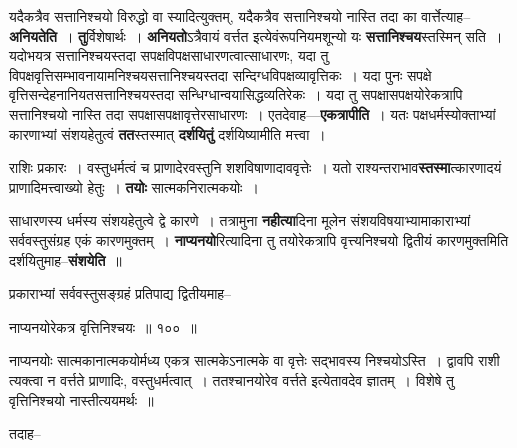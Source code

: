 \documentclass[article,12pt,a4paper]{memoir}
\begin{document}
	  \endgroup
	

	  \pstart यदैकत्रैव सत्तानिश्चयो विरुद्धो वा स्यादित्युक्तम्, यदैकत्रैव सत्तानिश्चयो नास्ति तदा का वार्त्तेत्याह--\textbf{अनियतेति} । \textbf{तु}र्विशेषार्थः । \textbf{अनियतो}ऽत्रैवायं वर्त्तत इत्येवंरूपनियमशून्यो यः \textbf{सत्तानिश्चय}स्तस्मिन् सति । यदोभयत्र सत्तानिश्चयस्तदा सपक्षविपक्षसाधारणत्वात्साधारणः, यदा तु विपक्षवृत्तिसम्भावनायामनिश्चयसत्तानिश्चयस्तदा सन्दिग्धविपक्षव्यावृत्तिकः । यदा पुनः सपक्षे वृत्तिसन्देहनानियतसत्तानिश्चयस्तदा सन्धिग्धान्वयासिद्धव्यतिरेकः । यदा तु सपक्षासपक्षयोरेकत्रापि सत्तानिश्चयो नास्ति तदा सपक्षासपक्षावृत्तेरसाधारणः । एतदेवाह—\textbf{एकत्रापीति} । यतः पक्षधर्मस्योक्ताभ्यां कारणाभ्यां संशयहेतुत्वं \textbf{तत}स्तस्मात् \textbf{दर्शयितुं} दर्शयिष्यामीति मत्त्वा ।
	\pend
      

	  \pstart राशिः प्रकारः । वस्तुधर्मत्वं च प्राणादेरवस्तुनि शशविषाणादाववृत्तेः । यतो राश्यन्तराभाव\textbf{स्तस्मा}त्कारणादयं प्राणादिमत्त्वाख्यो हेतुः । \textbf{तयोः} सात्मकनिरात्मकयोः ।
	\pend
      

	  \pstart साधारणस्य धर्मस्य संशयहेतुत्वे द्वे कारणे । तत्रामुना \textbf{नहीत्या}दिना मूलेन संशयविषयाभ्यामाकाराभ्यां सर्ववस्तुसंग्रह एकं कारणमुक्तम् । \textbf{नाप्यनयो}रित्यादिना तु तयोरेकत्रापि वृत्त्यनिश्चयो द्वितीयं कारणमुक्तमिति दर्शयितुमाह--\textbf{संशयेति} ॥
	\pend
	  \bigskip
	  \begingroup
	

	  \pstart प्रकाराभ्यां सर्ववस्तुसङ्ग्रहं प्रतिपाद्य द्वितीयमाह--
	\pend
        
	  \bigskip
	  \begingroup
	

	  \pstart नाप्यनयोरेकत्र वृत्तिनिश्चयः ॥ १०० ॥
	\pend
      
	  \endgroup
	 

	  \pstart नाप्यनयोः सात्मकानात्मकयोर्मध्य एकत्र सात्मकेऽनात्मके वा वृत्तेः सद्भावस्य निश्चयोऽस्ति । द्वावपि राशी त्यक्त्वा न वर्त्तते प्राणादिः, वस्तुधर्मत्वात् । ततश्चानयोरेव वर्त्तते इत्येतावदेव ज्ञातम् । विशेषे तु वृत्तिनिश्चयो नास्तीत्ययमर्थः ॥
	\pend
        

	  \pstart तदाह--
	\pend
        
\end{document}
